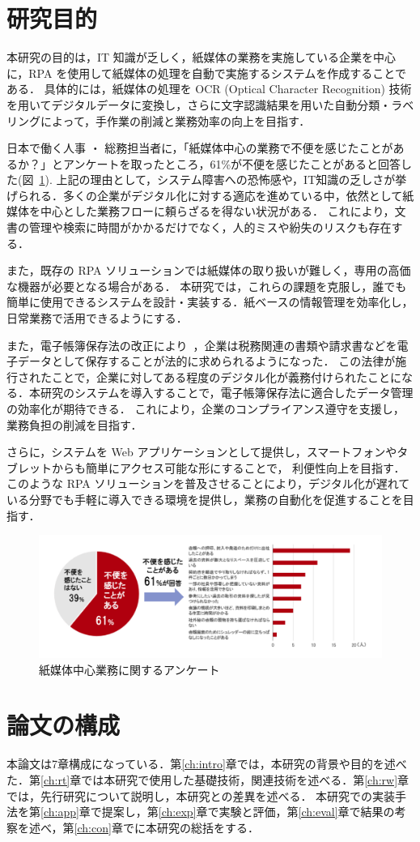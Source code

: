 \section{研究目的}
\label{sec:research_purpose}

本研究の目的は，IT 知識が乏しく，紙媒体の業務を実施している企業を中心に，RPA を使用して紙媒体の処理を自動で実施するシステムを作成することである．
具体的には，紙媒体の処理を OCR (Optical Character Recognition) 技術を用いてデジタルデータに変換し，さらに文字認識結果を用いた自動分類・ラベリングによって，手作業の削減と業務効率の向上を目指す．

日本で働く人事 ・ 総務担当者に，「紙媒体中心の業務で不便を感じたことがあるか？」とアンケートを取ったところ，61\%が不便を感じたことがあると回答した(図~\ref{fig:paper_media_survey}).
上記の理由として，システム障害への恐怖感や，IT知識の乏しさが挙げられる．多くの企業がデジタル化に対する適応を進めている中，依然として紙媒体を中心とした業務フローに頼らざるを得ない状況がある．
これにより，文書の管理や検索に時間がかかるだけでなく，人的ミスや紛失のリスクも存在する．

また，既存の RPA ソリューションでは紙媒体の取り扱いが難しく，専用の高価な機器が必要となる場合がある．
本研究では，これらの課題を克服し，誰でも簡単に使用できるシステムを設計・実装する．紙ベースの情報管理を効率化し，日常業務で活用できるようにする．

また，電子帳簿保存法の改正により~\cite{ito2023}，企業は税務関連の書類や請求書などを電子データとして保存することが法的に求められるようになった．
この法律が施行されたことで，企業に対してある程度のデジタル化が義務付けられたことになる．本研究のシステムを導入することで，電子帳簿保存法に適合したデータ管理の効率化が期待できる．
これにより，企業のコンプライアンス遵守を支援し，業務負担の削減を目指す．

さらに，システムを Web アプリケーションとして提供し，スマートフォンやタブレットからも簡単にアクセス可能な形にすることで，
利便性向上を目指す．このような RPA ソリューションを普及させることにより，デジタル化が遅れている分野でも手軽に導入できる環境を提供し，業務の自動化を促進することを目指す．

\begin{figure}[htbp]
  \vspace{1cm}
  \centering
  \includegraphics[scale = 0.6]{img/paper_media_survey.pdf}
  \caption{紙媒体中心業務に関するアンケート}
  \label{fig:paper_media_survey}
\end{figure}%

\section{論文の構成}
\label{sec_str}

本論文は7章構成になっている．第\ref{ch:intro}章では，本研究の背景や目的を述べた．第\ref{ch:rt}章では本研究で使用した基礎技術，関連技術を述べる．第\ref{ch:rw}章では，先行研究について説明し，本研究との差異を述べる．
本研究での実装手法を第\ref{ch:app}章で提案し，第\ref{ch:exp}章で実験と評価，第\ref{ch:eval}章で結果の考察を述べ，第\ref{ch:con}章でに本研究の総括をする．
